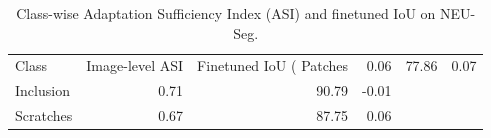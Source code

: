 \begin{table}[t]
\centering
\caption{Class-wise Adaptation Sufficiency Index (ASI) and finetuned IoU on NEU-Seg.}
\label{tab:asi}
\small
\begin{tabular}{lrrr}
\toprule
Class & Image-level ASI & Finetuned IoU (%
\midrule
Patches & 0.06 & 77.86 & 0.07 \\
Inclusion & 0.71 & 90.79 & -0.01 \\
Scratches & 0.67 & 87.75 & 0.06 \\
\bottomrule
\end{tabular}
\end{table}